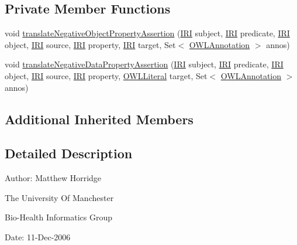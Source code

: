 \subsection*{Private Member Functions}
\begin{DoxyCompactItemize}
\item 
void \hyperlink{classorg_1_1coode_1_1owlapi_1_1rdfxml_1_1parser_1_1_type_negative_property_assertion_handler_a5ac3c23098e5c9e1fc1ca87ea742a450}{translate\-Negative\-Object\-Property\-Assertion} (\hyperlink{classorg_1_1semanticweb_1_1owlapi_1_1model_1_1_i_r_i}{I\-R\-I} subject, \hyperlink{classorg_1_1semanticweb_1_1owlapi_1_1model_1_1_i_r_i}{I\-R\-I} predicate, \hyperlink{classorg_1_1semanticweb_1_1owlapi_1_1model_1_1_i_r_i}{I\-R\-I} object, \hyperlink{classorg_1_1semanticweb_1_1owlapi_1_1model_1_1_i_r_i}{I\-R\-I} source, \hyperlink{classorg_1_1semanticweb_1_1owlapi_1_1model_1_1_i_r_i}{I\-R\-I} property, \hyperlink{classorg_1_1semanticweb_1_1owlapi_1_1model_1_1_i_r_i}{I\-R\-I} target, Set$<$ \hyperlink{interfaceorg_1_1semanticweb_1_1owlapi_1_1model_1_1_o_w_l_annotation}{O\-W\-L\-Annotation} $>$ annos)
\item 
void \hyperlink{classorg_1_1coode_1_1owlapi_1_1rdfxml_1_1parser_1_1_type_negative_property_assertion_handler_ac2f3aec085e7028a99501993f1264360}{translate\-Negative\-Data\-Property\-Assertion} (\hyperlink{classorg_1_1semanticweb_1_1owlapi_1_1model_1_1_i_r_i}{I\-R\-I} subject, \hyperlink{classorg_1_1semanticweb_1_1owlapi_1_1model_1_1_i_r_i}{I\-R\-I} predicate, \hyperlink{classorg_1_1semanticweb_1_1owlapi_1_1model_1_1_i_r_i}{I\-R\-I} object, \hyperlink{classorg_1_1semanticweb_1_1owlapi_1_1model_1_1_i_r_i}{I\-R\-I} source, \hyperlink{classorg_1_1semanticweb_1_1owlapi_1_1model_1_1_i_r_i}{I\-R\-I} property, \hyperlink{interfaceorg_1_1semanticweb_1_1owlapi_1_1model_1_1_o_w_l_literal}{O\-W\-L\-Literal} target, Set$<$ \hyperlink{interfaceorg_1_1semanticweb_1_1owlapi_1_1model_1_1_o_w_l_annotation}{O\-W\-L\-Annotation} $>$ annos)
\end{DoxyCompactItemize}
\subsection*{Additional Inherited Members}


\subsection{Detailed Description}
Author\-: Matthew Horridge\par
 The University Of Manchester\par
 Bio-\/\-Health Informatics Group\par
 Date\-: 11-\/\-Dec-\/2006\par
\par
 

